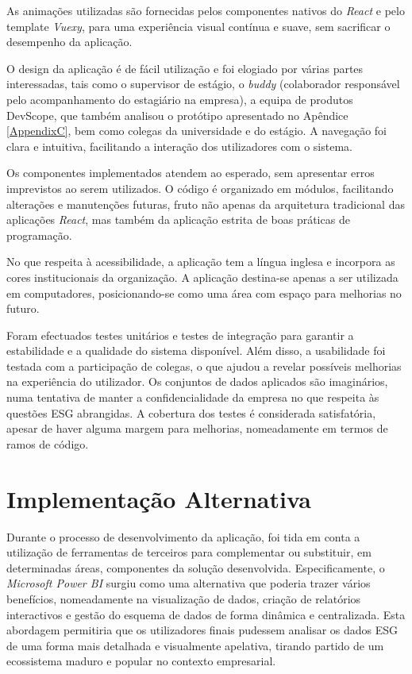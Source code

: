 As animações utilizadas são fornecidas pelos componentes nativos do \textit{React} e pelo template \textit{Vuexy}, para uma experiência visual contínua e suave, sem sacrificar o desempenho da aplicação.

O design da aplicação é de fácil utilização e foi elogiado por várias partes interessadas, tais como o supervisor de estágio, o \textit{buddy} (colaborador responsável pelo acompanhamento do estagiário na empresa), a equipa de produtos DevScope, que também analisou o protótipo apresentado no Apêndice \ref{AppendixC}, bem como colegas da universidade e do estágio. A navegação foi clara e intuitiva, facilitando a interação dos utilizadores com o sistema.

Os componentes implementados atendem ao esperado, sem apresentar erros imprevistos ao serem utilizados. O código é organizado em módulos, facilitando alterações e manutenções futuras, fruto não apenas da arquitetura tradicional das aplicações \textit{React}, mas também da aplicação estrita de boas práticas de programação.

No que respeita à acessibilidade, a aplicação tem a língua inglesa e incorpora as cores institucionais da organização. A aplicação destina-se apenas a ser utilizada em computadores, posicionando-se como uma área com espaço para melhorias no futuro.

Foram efectuados testes unitários e testes de integração para garantir a estabilidade e a qualidade do sistema disponível. Além disso, a usabilidade foi testada com a participação de colegas, o que ajudou a revelar possíveis melhorias na experiência do utilizador. Os conjuntos de dados aplicados são imaginários, numa tentativa de manter a confidencialidade da empresa no que respeita às questões ESG abrangidas. A cobertura dos testes é considerada satisfatória, apesar de haver alguma margem para melhorias, nomeadamente em termos de ramos de código.

\section{Implementação Alternativa} 

Durante o processo de desenvolvimento da aplicação, foi tida em conta a utilização de ferramentas de terceiros para complementar ou substituir, em determinadas áreas, componentes da solução desenvolvida. Especificamente, o \textit{Microsoft Power BI} surgiu como uma alternativa que poderia trazer vários benefícios, nomeadamente na visualização de dados, criação de relatórios interactivos e gestão do esquema de dados de forma dinâmica e centralizada. Esta abordagem permitiria que os utilizadores finais pudessem analisar os dados ESG de uma forma mais detalhada e visualmente apelativa, tirando partido de um ecossistema maduro e popular no contexto empresarial.

